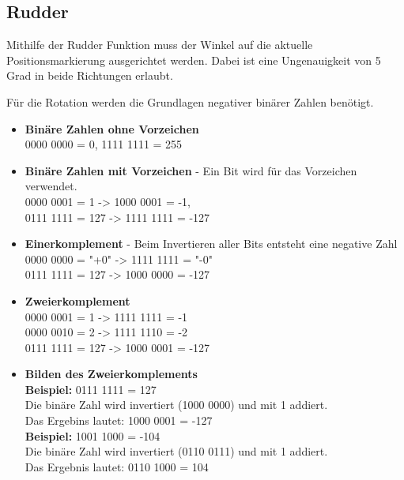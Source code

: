     \subsection*{Rudder}
    Mithilfe der Rudder Funktion muss der Winkel auf die aktuelle Positionsmarkierung ausgerichtet werden. Dabei ist eine Ungenauigkeit von 5 Grad in beide Richtungen erlaubt.

    Für die Rotation werden die Grundlagen negativer binärer Zahlen benötigt.

    \begin{itemize}
    \item \textbf{Binäre Zahlen ohne Vorzeichen}\\
    0000 0000 = 0, 1111 1111 = 255
    \item \textbf{Binäre Zahlen mit Vorzeichen} - Ein Bit wird für das Vorzeichen verwendet. \\
    0000 0001 = 1 -> 1000 0001 = -1, \\
    0111 1111 = 127 -> 1111 1111 = -127
    \item \textbf{Einerkomplement} - Beim Invertieren aller Bits entsteht eine negative Zahl \\
    0000 0000 = "+0" -> 1111 1111 = "-0" \\
    0111 1111 = 127 -> 1000 0000 = -127
    \item \textbf{Zweierkomplement}\\
    0000 0001 = 1 -> 1111 1111 = -1 \\
    0000 0010 = 2 -> 1111 1110 = -2 \\
    0111 1111 = 127 -> 1000 0001 = -127
    \item \textbf{Bilden des Zweierkomplements}\\
    \textbf{Beispiel:} 0111 1111 = 127 \\
    Die binäre Zahl wird invertiert (1000 0000) und mit 1 addiert. \\
    Das Ergebins lautet: 1000 0001 = -127 \\
    \textbf{Beispiel:} 1001 1000 = -104 \\
    Die binäre Zahl wird invertiert (0110 0111) und mit 1 addiert. \\
    Das Ergebnis lautet: 0110 1000 = 104 \\
    \end{itemize}

